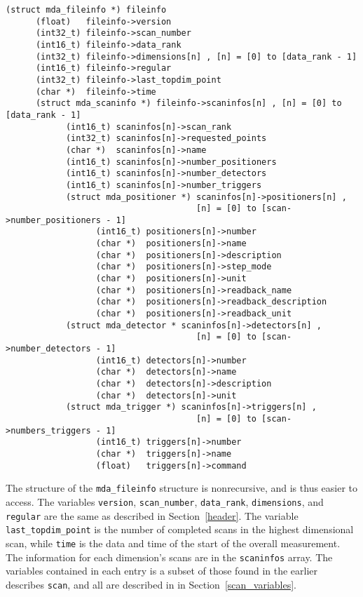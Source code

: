 \documentclass[10pt,letterpaper]{article}
\begin{document}
\begin{verbatim}
(struct mda_fileinfo *) fileinfo
      (float)   fileinfo->version
      (int32_t) fileinfo->scan_number
      (int16_t) fileinfo->data_rank
      (int32_t) fileinfo->dimensions[n] , [n] = [0] to [data_rank - 1]
      (int16_t) fileinfo->regular
      (int32_t) fileinfo->last_topdim_point
      (char *)  fileinfo->time
      (struct mda_scaninfo *) fileinfo->scaninfos[n] , [n] = [0] to [data_rank - 1]
            (int16_t) scaninfos[n]->scan_rank
            (int32_t) scaninfos[n]->requested_points
            (char *)  scaninfos[n]->name
            (int16_t) scaninfos[n]->number_positioners
            (int16_t) scaninfos[n]->number_detectors
            (int16_t) scaninfos[n]->number_triggers
            (struct mda_positioner *) scaninfos[n]->positioners[n] , 
                                      [n] = [0] to [scan->number_positioners - 1]
                  (int16_t) positioners[n]->number
                  (char *)  positioners[n]->name
                  (char *)  positioners[n]->description
                  (char *)  positioners[n]->step_mode
                  (char *)  positioners[n]->unit
                  (char *)  positioners[n]->readback_name
                  (char *)  positioners[n]->readback_description
                  (char *)  positioners[n]->readback_unit
            (struct mda_detector * scaninfos[n]->detectors[n] ,
                                      [n] = [0] to [scan->number_detectors - 1]
                  (int16_t) detectors[n]->number
                  (char *)  detectors[n]->name
                  (char *)  detectors[n]->description
                  (char *)  detectors[n]->unit
            (struct mda_trigger *) scaninfos[n]->triggers[n] ,
                                      [n] = [0] to [scan->numbers_triggers - 1]
                  (int16_t) triggers[n]->number
                  (char *)  triggers[n]->name
                  (float)   triggers[n]->command
\end{verbatim}

The structure of the \verb+mda_fileinfo+ structure is nonrecursive,
and is thus easier to access. The variables \verb+version+,
\verb+scan_number+, \verb+data_rank+, \verb+dimensions+, and
\verb+regular+ are the same as described in Section~\ref{header}. The
variable \verb+last_topdim_point+ is the number of completed scans in
the highest dimensional scan, while \verb+time+ is the data and time
of the start of the overall measurement. The information for each
dimension's scans are in the \verb+scaninfos+ array.  The variables
contained in each entry is a subset of those found in the earlier
describes \verb+scan+, and all are described in in
Section~\ref{scan_variables}.
\end{document}
